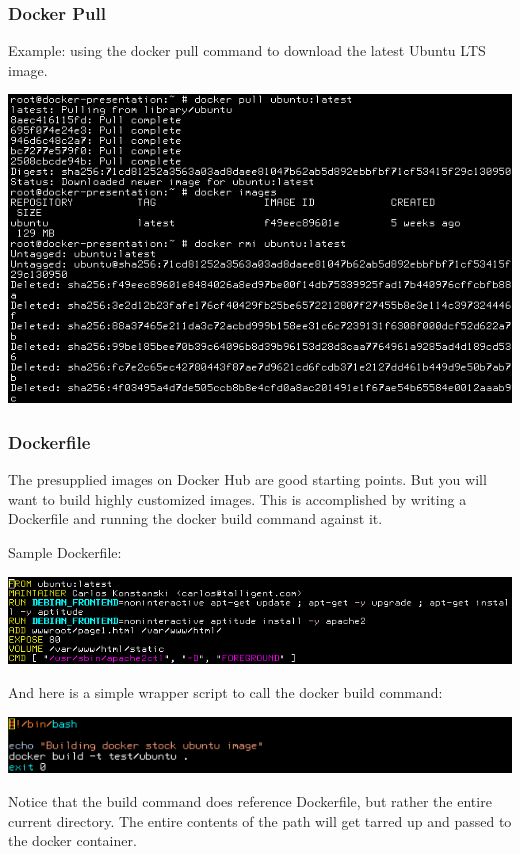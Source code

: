 \documentclass[helvetica,english,utf8,notitle,nologo]{beamer}
\begin{document}
\begin{frame}
  \frametitle{Docker Pull}

  Example: using the docker pull command to download the latest Ubuntu
  LTS image.

  \includegraphics[scale=0.48]{image_1}
\end{frame}

\begin{frame}
  \frametitle{Dockerfile}

  The presupplied images on Docker Hub are good starting points. But
  you will want to build highly customized images. This is
  accomplished by writing a Dockerfile and running the docker build
  command against it.

  Sample Dockerfile:

  \includegraphics[scale=0.44]{image_3}

  And here is a simple wrapper script to call the docker build command:

  \includegraphics[scale=0.48]{image_4}

  Notice that the build command does reference Dockerfile, but rather
  the entire current directory. The entire contents of the path will
  get tarred up and passed to the docker container.
\end{frame}
\end{document}
